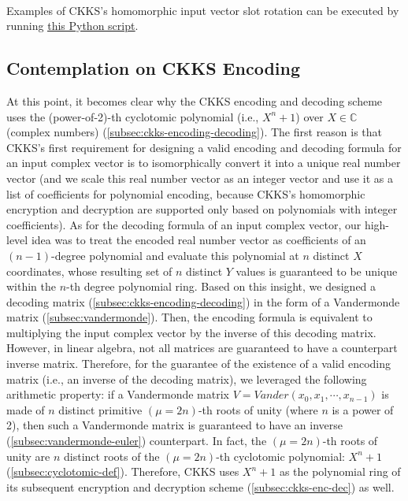 $ $


 Examples of CKKS's homomorphic input vector slot rotation can be executed by running \href{https://github.com/fhetextbook/fhe-textbook/blob/main/source%20code/ckks.py}{\underline{this Python script}}. 





\subsection{Contemplation on CKKS Encoding}
\label{subsec:ckks-encoding-contemplate}

 At this point, it becomes clear why the CKKS encoding and decoding scheme uses the (power-of-2)-th cyclotomic polynomial (i.e., $X^n + 1$) over $X \in \mathbb{C}$ (complex numbers) (\autoref{subsec:ckks-encoding-decoding}). The first reason is that CKKS's first requirement for designing a valid encoding and decoding formula for an input complex vector is to isomorphically convert it into a unique real number vector (and we scale this real number vector as an integer vector and use it as a list of coefficients for polynomial encoding, because CKKS's homomorphic encryption and decryption are supported only based on polynomials with integer coefficients). As for the decoding formula of an input complex vector, our high-level idea was to treat the encoded real number vector as coefficients of an $(n-1)$-degree polynomial and evaluate this polynomial at $n$ distinct $X$ coordinates, whose resulting set of $n$ distinct $Y$ values is guaranteed to be unique within the $n$-th degree polynomial ring. Based on this insight, we designed a decoding matrix (\autoref{subsec:ckks-encoding-decoding}) in the form of a Vandermonde matrix (\autoref{subsec:vandermonde}). Then, the encoding formula is equivalent to multiplying the input complex vector by the inverse of this decoding matrix. However, in linear algebra, not all matrices are guaranteed to have a counterpart inverse matrix. Therefore, for the guarantee of the existence of a valid encoding matrix (i.e., an inverse of the decoding matrix), we leveraged the following arithmetic property: if a Vandermonde matrix $V = \mathit{Vander}(x_0, x_1, \cdots, x_{n-1})$ is made of $n$ distinct primitive $(\mu=2n)$-th roots of unity (where $n$ is a power of 2), then such a Vandermonde matrix is guaranteed to have an inverse (\autoref{subsec:vandermonde-euler}) counterpart. In fact, the $(\mu=2n)$-th roots of unity are $n$ distinct roots of the $(\mu=2n)$-th cyclotomic polynomial: $X^n + 1$ (\autoref{subsec:cyclotomic-def}). Therefore, CKKS uses $X^n + 1$ as the polynomial ring of its subsequent encryption and decryption scheme (\autoref{subsec:ckks-enc-dec}) as well. 

